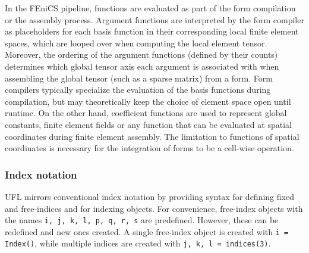 \documentclass[prodmode,acmtoms]{acmsmall}
\newcommand{\uflc}[1]{\texttt{#1}}
\begin{document}
In the FEniCS pipeline, functions are evaluated as part of the form
compilation or the assembly process. Argument functions are
interpreted by the form compiler as placeholders for each basis
function in their corresponding local finite element spaces, which are
looped over when computing the local element tensor.
Moreover, the ordering of the argument functions (defined by
their counts) determines which global tensor axis each argument is
associated with when assembling the global tensor (such as a sparse
matrix) from a form. Form compilers typically specialize the evaluation of
the basis functions during compilation, but may theoretically keep the
choice of element space open until runtime.
On the other hand, coefficient functions are
used to represent global constants, finite element fields or any
function that can be evaluated at spatial coordinates during finite
element assembly. The limitation to functions of spatial coordinates
is necessary for the integration of forms to be a cell-wise operation.

\subsubsection{Index notation}
\label{subsubsec:index_notation}

UFL mirrors conventional index notation by providing syntax for
defining fixed and free-indices and for indexing objects. For
convenience, free-index objects with the names
\uflc{i, j, k, l, p, q, r, s} are predefined. However, these can be
redefined and new ones created. A single free-index object is created
with \uflc{i = Index()}, while multiple indices are created with
\uflc{j, k, l = indices(3)}.
\end{document}
